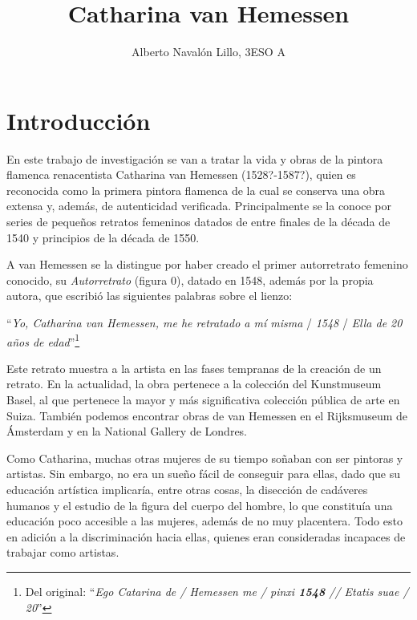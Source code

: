 \documentclass[12pt]{book}
\title{\textbf{Catharina van Hemessen}}
\author{Alberto Navalón Lillo, 3ESO A}
\begin{document}
\frontmatter
\maketitle
\tableofcontents
\mainmatter


\chapter*{Introducción}

En este trabajo de investigación se van a tratar la vida y obras de la pintora flamenca renacentista Catharina van Hemessen (1528?-1587?), quien es reconocida como la primera pintora flamenca de la cual se conserva una obra extensa y, además, de autenticidad verificada. Principalmente se la conoce por series de pequeños retratos femeninos datados de entre finales de la década de 1540 y principios de la década de 1550.\bigskip


A van Hemessen se la distingue por haber creado el primer autorretrato femenino conocido, su \textit{Autorretrato} (figura 0), datado en 1548, además por la propia autora, que escribió las siguientes palabras sobre el lienzo:\bigskip

\indent``\textit{Yo, Catharina van Hemessen, me he retratado a mí misma} / \textit{1548} / \textit{Ella de 20 años de edad}''\footnote{Del original: ``\textit{Ego Catarina de / Hemessen me / pinxi \textbf{1548} // Etatis suae / 20}''}\bigskip

Este retrato muestra a la artista en las fases tempranas de la creación de un retrato. En la actualidad, la obra pertenece a la colección del Kunstmuseum Basel, al que pertenece la mayor y más significativa colección pública de arte en Suiza. También podemos encontrar obras de van Hemessen en el Rijksmuseum de Ámsterdam y en la National Gallery de Londres.\bigskip

Como Catharina, muchas otras mujeres de su tiempo soñaban con ser pintoras y artistas. Sin embargo, no era un sueño fácil de conseguir para ellas, dado que su educación artística implicaría, entre otras cosas, la disección de cadáveres humanos y el estudio de la figura del cuerpo del hombre, lo que constituía una educación poco accesible a las mujeres, además de no muy placentera. Todo esto en adición a la discriminación hacia ellas, quienes eran consideradas incapaces de trabajar como artistas.\bigskip
\end{document}
